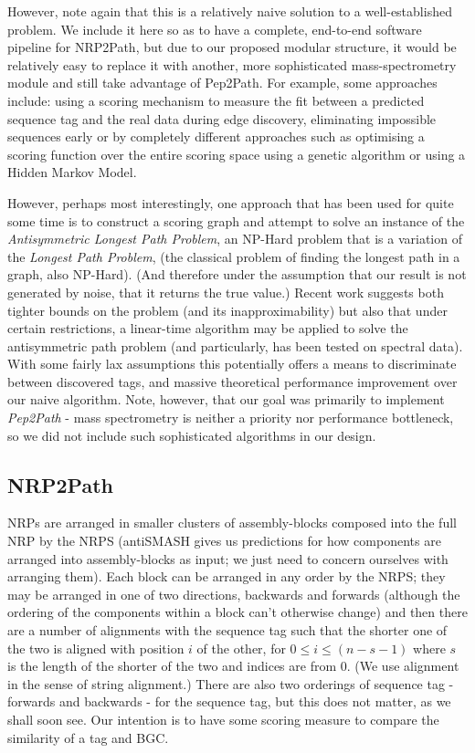 \documentclass{l4proj}
\newcommand{\cit}[1]{\citep{#1}}
\begin{document}
However, note again that this is a relatively naive solution to a well-established problem. We include it here so as to have a complete, end-to-end software pipeline for NRP2Path, but due to our proposed modular structure, it would be relatively easy to replace it with another, more sophisticated mass-spectrometry module and still take advantage of Pep2Path. For example, some approaches include: using a scoring mechanism to measure the fit between a predicted sequence tag and the real data during edge discovery, eliminating impossible sequences early or by completely different approaches such as optimising a scoring function over the entire scoring space using a genetic algorithm or using a Hidden Markov Model. \cit{protointro}

However, perhaps most interestingly, one approach that has been used for quite some time is to construct a scoring graph and attempt to solve an instance of the \textit{Antisymmetric Longest Path Problem}, an NP-Hard problem that is a variation of the \textit{Longest Path Problem}, (the classical problem of finding the longest path in a graph, also NP-Hard). \cit{protobook} (And therefore under the assumption that our result is not generated by noise, that it returns the true value.) Recent work suggests both tighter bounds on the problem (and its inapproximability) \cit{alppbound} but also that under certain restrictions, a linear-time algorithm may be applied to solve the antisymmetric path problem (and particularly, has been tested on spectral data). \cit{alpplinear} With some fairly lax assumptions this potentially offers a means to discriminate between discovered tags, and massive theoretical performance improvement over our naive algorithm. Note, however, that our goal was primarily to implement \textit{Pep2Path} - mass spectrometry is neither a priority nor performance bottleneck, so we did not include such sophisticated algorithms in our design.

\subsection{NRP2Path}

NRPs are arranged in smaller clusters of assembly-blocks composed into the full NRP by the NRPS (antiSMASH gives us predictions for how components are arranged into assembly-blocks as input; we just need to concern ourselves with arranging them). Each block can be arranged in any order by the NRPS; they may be arranged in one of two directions, backwards and forwards (although the ordering of the components within a block can't otherwise change) and then there are a number of alignments with the sequence tag such that the shorter one of the two is aligned with position \(i\) of the other, for \(0 \leq i \leq (n-s-1)\) where \(s\) is the length of the shorter of the two and indices are from \(0\). (We use alignment in the sense of string alignment.) There are also two orderings of sequence tag - forwards and backwards - for the sequence tag, but this does not matter, as we shall soon see. Our intention is to have some scoring measure to compare the similarity of a tag and BGC.
\end{document}

